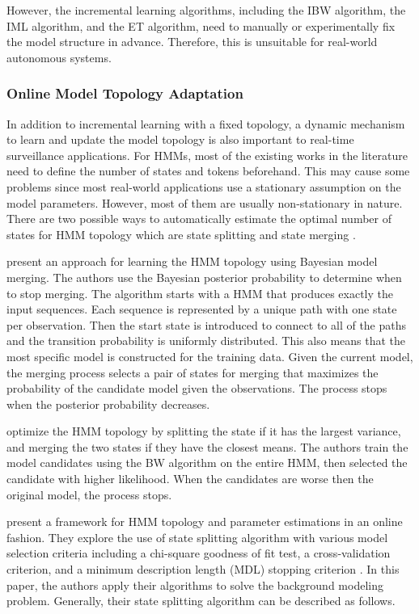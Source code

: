However, the incremental learning algorithms, including the IBW
algorithm, the IML algorithm, and the ET algorithm, need to manually
or experimentally fix the model structure in advance. Therefore, this
is unsuitable for real-world autonomous systems.

\subsubsection{Online Model Topology Adaptation} 
\label{topology-adaptation}

In addition to incremental learning with a fixed topology, a dynamic
mechanism to learn and update the model topology is also important to
real-time surveillance applications. For HMMs, most of the existing
works in the literature need to define the number of states and tokens
beforehand. This may cause some problems since most real-world
applications use a stationary assumption on the model
parameters. However, most of them are usually non-stationary in
nature. There are two possible ways to automatically estimate the
optimal number of states for HMM topology which are state
splitting 
and state merging .

 present an approach for learning the
HMM topology using Bayesian model merging. The authors use the
Bayesian posterior probability to determine when to stop merging. The
algorithm starts with a HMM that produces exactly the input
sequences. Each sequence is represented by a unique path with one
state per observation. Then the start state is introduced to connect
to all of the paths and the transition probability is uniformly
distributed. This also means that the most specific model is
constructed for the training data. Given the current model, the
merging process selects a pair of states for merging that maximizes
the probability of the candidate model given the observations. The
process stops when the posterior probability decreases.

 optimize the HMM topology by splitting the
state if it has the largest variance, and merging the two states if
they have the closest means. The authors train the model candidates
using the BW algorithm on the entire HMM, then selected the candidate
with higher likelihood. When the candidates are worse then the
original model, the process stops.

 present a framework for HMM topology
and parameter estimations in an online fashion. They explore the use
of state splitting algorithm with various model selection criteria
including a chi-square goodness of fit test, a cross-validation
criterion, and a minimum description length (MDL) stopping
criterion . In this paper, the authors apply
their algorithms to solve the background modeling problem. Generally,
their state splitting algorithm can be described as follows.

